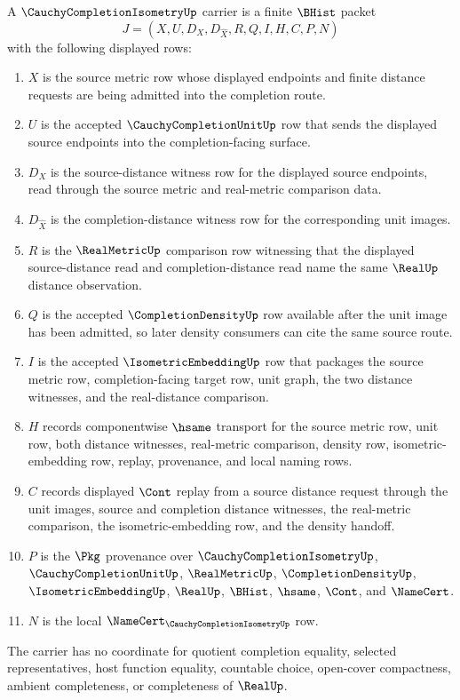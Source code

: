 \begin{definition}
\label{def:cauchy-completion-isometry-carrier}
A $\CauchyCompletionIsometryUp$ carrier is a finite $\BHist$ packet
$$
J=(X,U,D_X,D_{\widehat X},R,Q,I,H,C,P,N)
$$
with the following displayed rows:
\begin{enumerate}
\item $X$ is the source metric row whose displayed endpoints and finite distance requests are being admitted into the completion route.
\item $U$ is the accepted $\CauchyCompletionUnitUp$ row that sends the displayed source endpoints into the completion-facing surface.
\item $D_X$ is the source-distance witness row for the displayed source endpoints, read through the source metric and real-metric comparison data.
\item $D_{\widehat X}$ is the completion-distance witness row for the corresponding unit images.
\item $R$ is the $\RealMetricUp$ comparison row witnessing that the displayed source-distance read and completion-distance read name the same $\RealUp$ distance observation.
\item $Q$ is the accepted $\CompletionDensityUp$ row available after the unit image has been admitted, so later density consumers can cite the same source route.
\item $I$ is the accepted $\IsometricEmbeddingUp$ row that packages the source metric row, completion-facing target row, unit graph, the two distance witnesses, and the real-distance comparison.
\item $H$ records componentwise $\hsame$ transport for the source metric row, unit row, both distance witnesses, real-metric comparison, density row, isometric-embedding row, replay, provenance, and local naming rows.
\item $C$ records displayed $\Cont$ replay from a source distance request through the unit images, source and completion distance witnesses, the real-metric comparison, the isometric-embedding row, and the density handoff.
\item $P$ is the $\Pkg$ provenance over $\CauchyCompletionIsometryUp$, $\CauchyCompletionUnitUp$, $\RealMetricUp$, $\CompletionDensityUp$, $\IsometricEmbeddingUp$, $\RealUp$, $\BHist$, $\hsame$, $\Cont$, and $\NameCert$.
\item $N$ is the local $\NameCert_{\CauchyCompletionIsometryUp}$ row.
\end{enumerate}
The carrier has no coordinate for quotient completion equality, selected representatives, host function equality, countable choice, open-cover compactness, ambient completeness, or completeness of $\RealUp$.
\end{definition}

